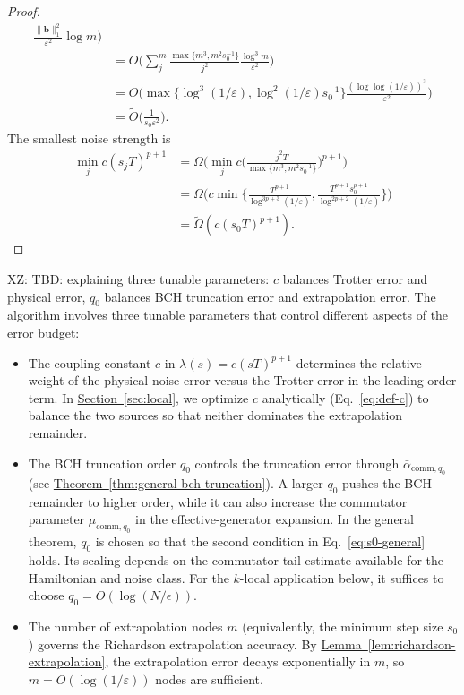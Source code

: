 \documentclass[aps,pra,reprint,groupedaddress,floatfix]{revtex4-2}
\newcommand{\thm}[1]{\hyperref[thm:#1]{Theorem~\ref*{thm:#1}}}
\newcommand{\lem}[1]{\hyperref[lem:#1]{Lemma~\ref*{lem:#1}}}
\renewcommand{\sec}[1]{\hyperref[sec:#1]{Section~\ref*{sec:#1}}}
\newcommand{\eps}{\varepsilon}
\newcommand{\xz}[1]{{\color{cyan} XZ: #1}}
\begin{document}
\begin{proof}
\begin{align*}
        \frac{\|\mathbf{b}\|_1^2}{\eps^2}\log m\Big)\\
        &=
        O\Bigg(
        \sum_j^{m}
        \frac{\max\{m^3, m^2s_0^{-1}\}}{j^2}
        \frac{\log^3 m}{\eps^2}
        \Bigg)\\
        &=
        O\Bigg(
        \max\{\log^3(1/\eps), \log^2(1/\eps)s_0^{-1}\}
        \frac{(\log\log (1/\eps))^3}{\eps^2}
        \Bigg) \\
        &= \widetilde{O}\Big(\frac{1}{s_0\eps^2}\Big).
    \end{align*}
    The smallest noise strength is
    \begin{align*}
        \min_{j}c(s_jT)^{p+1} &= \Omega\Big(\min_{j}c\Big(\frac{j^2T}{\max\{m^3, m^2s_0^{-1}\}}\Big)^{p+1}\Big) \\
        &=\Omega\Big(c\min\Big\{\frac{T^{p+1}}{\log^{3p+3}(1/\eps)}, \frac{ T^{p+1}s_0^{p+1}}{\log^{2p+2}(1/\eps)}\Big\}\Big)\\
        & = \widetilde{\Omega}(c (s_0 T)^{p+1}).
    \end{align*}
\end{proof}
\xz{TBD: explaining three tunable parameters: $c$ balances Trotter error and physical error, $q_0$ balances BCH truncation error and extrapolation error.}
The algorithm involves three tunable parameters that control different aspects of the error budget:
\begin{itemize}
    \item The coupling constant $c$ in $\lambda(s)=c(sT)^{p+1}$ determines the relative weight of the physical noise error versus the Trotter error in the leading-order term. In \sec{local}, we optimize $c$ analytically (Eq.~\eqref{eq:def-c}) to balance the two sources so that neither dominates the extrapolation remainder.
    \item The BCH truncation order $q_0$ controls the truncation error through $\bar{\alpha}_{\mathrm{comm},q_0}$ (see \thm{general-bch-truncation}). A larger $q_0$ pushes the BCH remainder to higher order, while it can also increase the commutator parameter $\mu_{\mathrm{comm},q_0}$ in the effective-generator expansion. In the general theorem, $q_0$ is chosen so that the second condition in Eq.~\eqref{eq:s0-general} holds. Its scaling depends on the commutator-tail estimate available for the Hamiltonian and noise class. For the $k$-local application below, it suffices to choose $q_0=O(\log(N/\epsilon))$.
    \item The number of extrapolation nodes $m$ (equivalently, the minimum step size $s_0$) governs the Richardson extrapolation accuracy. By \lem{richardson-extrapolation}, the extrapolation error decays exponentially in $m$, so $m = O(\log(1/\eps))$ nodes are sufficient.
\end{itemize}
\end{document}
